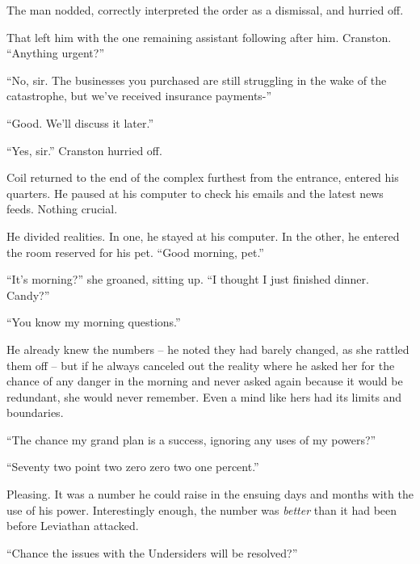The man nodded, correctly interpreted the order as a dismissal, and hurried off.



That left him with the one remaining assistant following after him.  Cranston.  ``Anything urgent?''



``No, sir.  The businesses you purchased are still struggling in the wake of the catastrophe, but we've received insurance payments-''



``Good.  We'll discuss it later.''



``Yes, sir.''  Cranston hurried off.



Coil returned to the end of the complex furthest from the entrance, entered his quarters.  He paused at his computer to check his emails and the latest news feeds.  Nothing crucial.



He divided realities.  In one, he stayed at his computer.  In the other, he entered the room reserved for his pet.  ``Good morning, pet.''



``It's morning?'' she groaned, sitting up.  ``I thought I just finished dinner.  Candy?''



``You know my morning questions.''



He already knew the numbers – he noted they had barely changed, as she rattled them off – but if he always canceled out the reality where he asked her for the chance of any danger in the morning and never asked again because it would be redundant, she would never remember.  Even a mind like hers had its limits and boundaries.



``The chance my grand plan is a success, ignoring any uses of my powers?''



``Seventy two point two zero zero two one percent.''



Pleasing.  It was a number he could raise in the ensuing days and months with the use of his power.  Interestingly enough, the number was\emph{ better} than it had been before Leviathan attacked.



``Chance the issues with the Undersiders will be resolved?''



